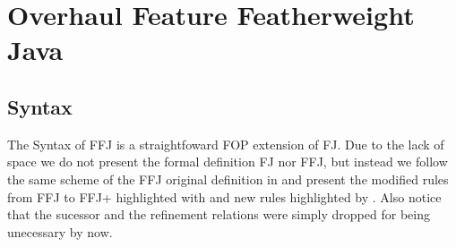 \chapter{Overhaul Feature Featherweight Java}\label{seq:ffj}

\section{Syntax}
The Syntax of \ac{FFJ} is a straightfoward \ac{FOP} extension of \ac{FJ}. Due to the lack
of space we do not present the formal definition \ac{FJ} nor \ac{FFJ}, but instead we follow
the same scheme of the \ac{FFJ} original definition in \cite{apel_feature_2008} and present
the modified rules from \ac{FFJ} to \ac{FFJ+} highlighted with  
and new rules highlighted by . Also notice that the sucessor and 
the refinement relations were simply dropped for being unecessary by now.

\newcommand{\cdecl}[6]{\texttt{class #1 extends #2 \{\={#3} \={#4}; #5 \={#6}\}}}
\newcommand{\crefine}[6]{\texttt{refines class #1 \{\={#2} \={#3}; #4 \={#5} \={#6}\}}}
\newcommand{\mdecl}[5]{\texttt{#1 #2 (\={#3} \={#4}) \{return #5;\}}}
\newcommand{\mrefine}[5]{\texttt{refines #1 #2 (\={#3} \={#4}) \{return #5;\}}}

